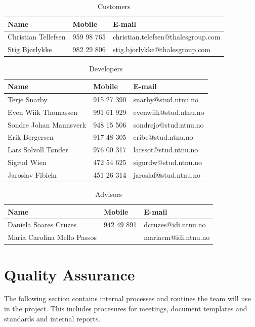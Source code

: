 \begin{table}[!htb] \footnotesize \center
\caption{Customers\label{tab:plan:customer}}
\begin{tabular}{l l l}
	\toprule
	Name & Mobile & E-mail \\ 
	\midrule
	Christian Tellefsen & 959 98 765 & christian.telefsen@thalesgroup.com \\ 
	Stig Bjørlykke & 982 29 806 & stig.bjorlykke@thalesgroup.com \\ 
	\bottomrule
\end{tabular}
\end{table}

\begin{table}[!htb] \footnotesize \center
\caption{Developers\label{tab:plan:devs}}
\begin{tabular}{l l l}
	\toprule
	Name & Mobile & E-mail  \\ 
	\midrule
	Terje Snarby & 915 27 390 & snarby@stud.ntnu.no \\ 
	Even Wiik Thomassen & 991 61 929 & evenwiik@stud.ntnu.no \\ 
	Sondre Johan Mannsverk & 948 15 506 & sondrejo@stud.ntnu.no \\ 
	Erik Bergersen & 917 48 305 & eribe@stud.ntnu.no \\ 
	Lars Solvoll Tønder & 976 00 317 & larssot@stud.ntnu.no \\ 
	Sigrud Wien & 472 54 625 & sigurdw@stud.ntnu.no \\ 
	Jaroslav Fibichr & 451 26 314 & jaroslaf@stud.ntnu.no \\ 
	\bottomrule
\end{tabular}
\end{table}

\begin{table}[!htb] \footnotesize \center
\caption{Advisors\label{tab:plan:advisors}}
\begin{tabular}{l l l}
	\toprule
	Name & Mobile & E-mail \\ 
	\midrule
	Daniela Soares Cruzes & 942 49 891 & dcruzes@idi.ntnu.no \\ 
	Maria Carolina Mello Passos & & mariacm@idi.ntnu.no \\ 
	\bottomrule
\end{tabular}
\end{table}


\section{Quality Assurance}
The following section contains internal processes and routines the team will use in the project. This includes procesures for meetings, document templates and standards and internal reports.

